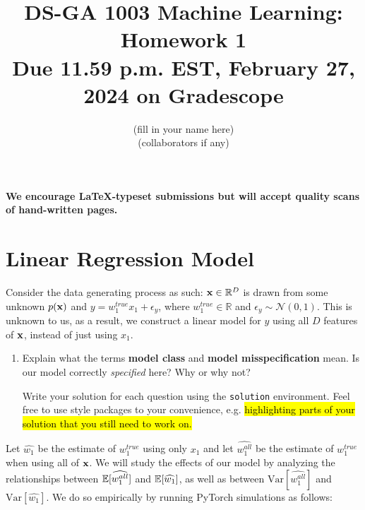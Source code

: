 \documentclass[11pt]{article}
\newenvironment{solution}{\proof[Solution]\color{blue}}{\endproof}
\begin{document}
\title{DS-GA 1003 Machine Learning: Homework 1 \\
\textbf{\large{Due 11.59 p.m. EST, February 27, 2024 on Gradescope}}}
\author{{\color{blue}(fill in your name here)}\\
    {\color{blue}(collaborators if any)}}
\date{}
\maketitle
\vspace{-1cm}

\noindent \textbf{We encourage \LaTeX-typeset submissions but will accept quality scans of hand-written pages.}

\section{Linear Regression Model}

Consider the data generating process as such: ${\mathbf x} \in \mathbb{R}^D$ is drawn from some unknown $p({\mathbf x})$ and $y = w_1^{true} x_1 + \epsilon_y$, where $w_1^{true} \in \mathbb{R}$ and $\epsilon_y \sim \mathcal{N}(0,1)$. This is unknown to us, as a result, we construct a linear model for $y$ using all $D$ features of ${\mathbf x}$, instead of just using $x_1$.

\begin{enumerate}[label=(\Alph*)]
    \item Explain what the terms \textbf{model class} and \textbf{model misspecification} mean. Is our model correctly \textit{specified} here? Why or why not?

    \begin{solution}
        Write your solution for each question using the \texttt{solution} environment. Feel free to use style packages to your convenience, e.g. \hl{highlighting parts of your solution that you still need to work on.}
    \end{solution}

\end{enumerate}

\noindent Let $\widehat{w_1}$ be the estimate of $w_1^{true}$ using only $x_1$ and let $\widehat{w_1^{all}}$ be the estimate of $w_1^{true}$ when using all of ${\mathbf x}$. We will study the effects of our model by analyzing the relationships between $\mathbb{E}[\widehat{w_1^{all}}]$ and $\mathbb{E}[\widehat{w_1}]$, as well as between $\text{Var}[\widehat{w_1^{all}}]$ and $\text{Var}[\widehat{w_1}]$. We do so empirically by running PyTorch simulations as follows:
\end{document}
